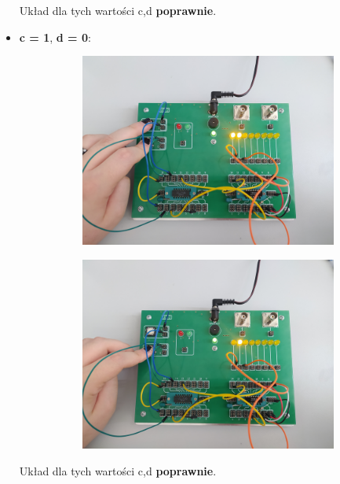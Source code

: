 \begin{itemize}
        Układ dla tych wartości c,d \textbf{poprawnie}.

    \item \textbf{c = 1}, \textbf{d = 0}:
        \begin{figure}[H]
            \centering
            \begin{subfigure}[H]{0.4\textwidth}
                \includegraphics[width=\textwidth]{img/synch_RS/1653500525372_scaled.png}
            \end{subfigure}
            \begin{subfigure}[H]{0.4\textwidth}
                \includegraphics[width=\textwidth]{img/synch_RS/1653500525388_scaled.png}
            \end{subfigure}
        \end{figure}

        Układ dla tych wartości c,d \textbf{poprawnie}.
\end{itemize}

